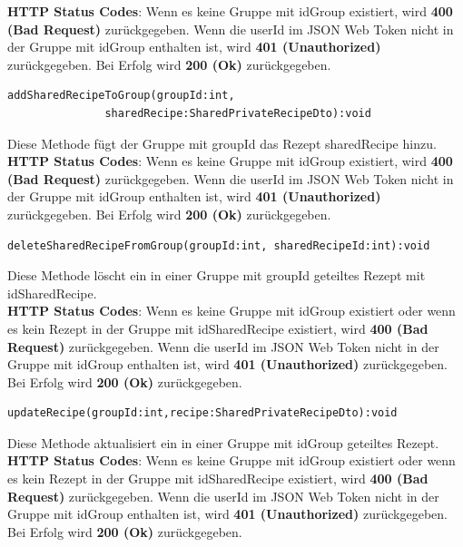 \textbf{HTTP Status Codes}:
Wenn es keine Gruppe mit idGroup existiert, wird \textbf{400 (Bad Request)} zurückgegeben. Wenn die userId im JSON Web Token nicht in der Gruppe mit idGroup enthalten ist, wird \textbf{401 (Unauthorized)} zurückgegeben. Bei Erfolg wird \textbf{200 (Ok)} zurückgegeben.
\vspace{1cm}  
 \begin{lstlisting}
addSharedRecipeToGroup(groupId:int, 
               sharedRecipe:SharedPrivateRecipeDto):void
\end{lstlisting}
Diese Methode fügt der Gruppe mit groupId das Rezept sharedRecipe hinzu.\\
\textbf{HTTP Status Codes}:
Wenn es keine Gruppe mit idGroup existiert, wird \textbf{400 (Bad Request)} zurückgegeben. Wenn die userId im JSON Web Token nicht in der Gruppe mit idGroup enthalten ist, wird \textbf{401 (Unauthorized)} zurückgegeben. Bei Erfolg wird \textbf{200 (Ok)} zurückgegeben. 
\vspace{1cm}  
 \begin{lstlisting}
deleteSharedRecipeFromGroup(groupId:int, sharedRecipeId:int):void
\end{lstlisting}
Diese Methode löscht ein in einer Gruppe mit groupId geteiltes Rezept mit idSharedRecipe.\\
\textbf{HTTP Status Codes}:
Wenn es keine Gruppe mit idGroup existiert oder wenn es kein Rezept in der Gruppe mit idSharedRecipe existiert, wird \textbf{400 (Bad Request)} zurückgegeben. Wenn die userId im JSON Web Token nicht in der Gruppe mit idGroup enthalten ist, wird \textbf{401 (Unauthorized)} zurückgegeben. Bei Erfolg wird \textbf{200 (Ok)} zurückgegeben. 
\vspace{1cm}  
 \begin{lstlisting}
updateRecipe(groupId:int,recipe:SharedPrivateRecipeDto):void
\end{lstlisting}
Diese Methode aktualisiert ein in einer Gruppe mit idGroup geteiltes Rezept.\\
\textbf{HTTP Status Codes}:
Wenn es keine Gruppe mit idGroup existiert oder wenn es kein Rezept in der Gruppe mit idSharedRecipe existiert, wird \textbf{400 (Bad Request)} zurückgegeben. Wenn die userId im JSON Web Token nicht in der Gruppe mit idGroup enthalten ist, wird \textbf{401 (Unauthorized)} zurückgegeben. Bei Erfolg wird \textbf{200 (Ok)} zurückgegeben. 
\vspace{1cm}
